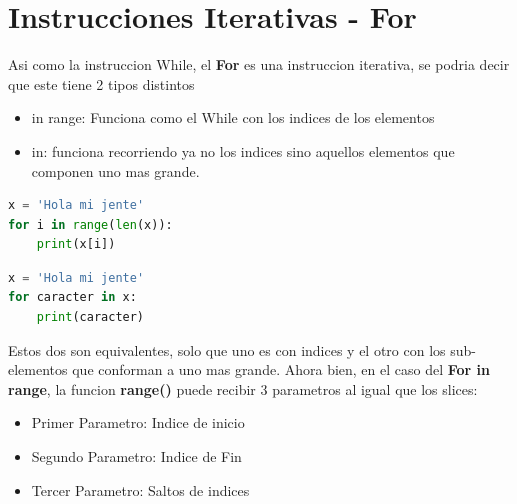 \documentclass{article}
\begin{document}
\section{Instrucciones Iterativas - For}
Asi como la instruccion While, el \textbf{For} es una instruccion iterativa, se podria decir que este tiene 2 tipos distintos
\begin{itemize}
    \item in range: Funciona como el While con los indices de los elementos
    \item in: funciona recorriendo ya no los indices sino aquellos elementos que componen uno mas grande.
\end{itemize}
\begin{lstlisting}[language=Python, caption=For in range]
x = 'Hola mi jente'
for i in range(len(x)):
    print(x[i])
\end{lstlisting}
\begin{lstlisting}[language=Python, caption=For each]
x = 'Hola mi jente'
for caracter in x:
    print(caracter)
\end{lstlisting}
Estos dos son equivalentes, solo que uno es con indices y el otro con los sub-elementos que conforman a uno mas grande. Ahora bien, en el caso del \textbf{For in range}, la funcion \textbf{range()} puede recibir 3 parametros al igual que los slices: 
\begin{itemize}
    \item Primer Parametro: Indice de inicio
    \item Segundo Parametro: Indice de Fin
    \item Tercer Parametro: Saltos de indices
\end{itemize}
\end{document}
